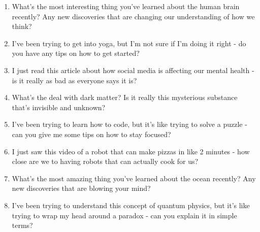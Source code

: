 \documentclass{article}
\begin{document}
\begin{promptbox1}
\begin{enumerate}
    \item What's the most interesting thing you've learned about the human brain recently? Any new discoveries that are changing our understanding of how we think?
    \item I've been trying to get into yoga, but I'm not sure if I'm doing it right - do you have any tips on how to get started?
    \item I just read this article about how social media is affecting our mental health - is it really as bad as everyone says it is?
    \item What's the deal with dark matter? Is it really this mysterious substance that's invisible and unknown?
    \item I've been trying to learn how to code, but it's like trying to solve a puzzle - can you give me some tips on how to stay focused?
    \item I just saw this video of a robot that can make pizzas in like 2 minutes - how close are we to having robots that can actually cook for us?
    \item What's the most amazing thing you've learned about the ocean recently? Any new discoveries that are blowing your mind?
    \item I've been trying to understand this concept of quantum physics, but it's like trying to wrap my head around a paradox - can you explain it in simple terms?
\end{enumerate}

\label{blue-box}
\end{promptbox1}
\clearpage
\end{document}
